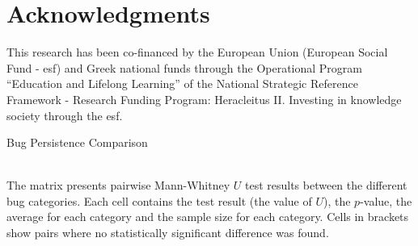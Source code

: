 \documentclass{sig-alternate}
\begin{document}
\section{Acknowledgments}
This research has been co-financed by the European Union (European Social Fund
- {\sc esf}) and Greek national funds through the Operational Program
``Education and Lifelong Learning'' of the National Strategic Reference Framework -
Research Funding Program: Heracleitus II. Investing in knowledge society
through the {\sc esf}.



  

\begin{landscape}
  \begin{table}
    \setlength{\extrarowheight}{0.10cm}
    \caption{Bug Persistence Comparison}
    \label{tbl:bug_persistence}
    \resizebox{0.95\columnwidth}{!}{
    }\\
    The matrix presents pairwise Mann-Whitney $U$ test results
    between the different bug categories. Each cell contains the test
    result (the value of $U$), the $p$-value, the average for each
    category and the sample size for each category. Cells in brackets show
    pairs where no statistically significant difference was found.
  \end{table}
\end{landscape}
\end{document}
